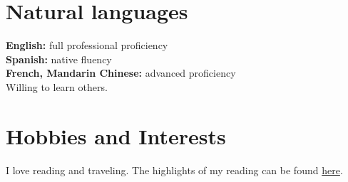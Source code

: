 \documentclass[11pt]{article}
\begin{document}
\section*{Natural languages}
\label{sec:orga18b34e}
\textbf{English:} full professional proficiency\\
\textbf{Spanish:} native fluency\\
\textbf{French, Mandarin Chinese:} advanced proficiency\\
Willing to learn others.\\
\section*{Hobbies and Interests}
\label{sec:orga6cd90d}
I love reading and traveling. The highlights of my reading can be found \href{https://github.com/RCoeurjoly/my\_clippings/blob/master/clippings.org}{here}.\\
\end{document}

